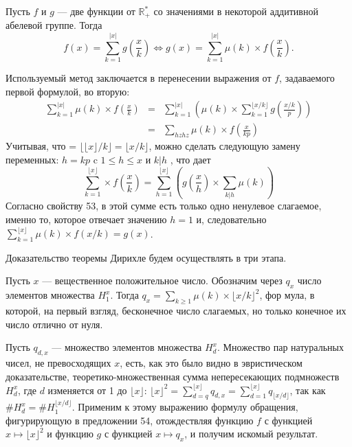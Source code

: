 \begin{predl}
Пусть $f$ и $g$ — две функции от $\mathbb{R}_{+}^{*}$ со значениями в некоторой ад­дитивной абелевой группе. Тогда
$$f(x)=\sum\limits_{k=1}^{|x|} g\left(\frac{x}{k}\right) \Longleftrightarrow g(x)=\sum\limits_{k=1}^{|x|}\mu(k)\times f\left(\frac{x}{k}\right).$$
\end{predl}
\begin{myproof}
Используемый метод заключается в перенесении выражения от $f$,
задаваемого первой формулой, во вторую:
$$\begin{array}{rcc}
\sum\limits_{k=1}^{|x|}\mu(k)\times f\left(\frac{x}{k}\right)&=&\sum\limits_{k=1}^{|x|}\left(\mu(k)\times\sum\limits_{k=1}^{\lfloor x/k \rfloor} g\left(\frac{x/k}{p}\right)\right)\\
&=&\sum\limits_{hzhz}\mu(k)\times f\left(\frac{x}{kp}\right)
\end{array}$$
Учитывая, что = $\lfloor\lfloor x \rfloor/k\rfloor = \lfloor x/k\rfloor$, можно сделать следующую замену
переменных: $h=kp$ c $1\leqslant h\leqslant x$ и $k|h$ , что дает
\newpage
$$\sum\limits_{k=1}^{\lfloor x \rfloor}\times f\left(\frac{x}{k}\right)=\sum_{h=1}^{\lfloor x\rfloor}\left( g\left(\frac{x}{h}\right)\times\sum\limits_{k|h}\mu(k)\right)$$
Согласно свойству 53, в этой сумме есть только одно ненулевое слагаемое, именно то, которое отвечает значению $h=1$ и, следовательно $\sum\nolimits_{k=1}^{\lfloor x\rfloor}\mu(k)\times f(x/k)=g(x)$.
\end{myproof}
Доказательство теоремы Дирихле будем осуществлять в три этапа.
\begin{lemma}
\hspace*{0.5cm}Пусть $x$ — вещественное положительное число. Обозначим через $q_{x}$
число элементов множества $H_{1}^x$. Тогда $q_{x}=\sum\nolimits_{k\geqslant 1}\mu(k)\times\lfloor x/k\rfloor^2$, фор­
мула, в которой, на первый взгляд, бесконечное число слагаемых, но
только конечное их число отлично от нуля.
\end{lemma}
\begin{myproof}
Пусть $q_{d,x}$ — множество элементов множества $H_{d}^x$. Множество пар
натуральных чисел, не превосходящих $x$, есть, как это было видно
в эвристическом доказательстве, теоретико-множественная сумма
непересекающих подмножеств $H_{d}^x$, где $d$ изменяется от 1 до $\lfloor x\rfloor$: $\lfloor x\rfloor^2=\sum\nolimits_{d=q}^{\lfloor x\rfloor}q_{d,x}=\sum\nolimits_{d=1}^{\lfloor x\rfloor}q_{\lfloor x/d\rfloor}$, так как $\#H_{d}^x=\#H_{1}^{\lfloor x/d\rfloor}$. Применим к этому выражению формулу обращения, фигурирующую в
предложении 54, отождествляя функцию $f$ с функцией $x\mapsto\lfloor x\rfloor^2$
 и функцию $g$ с функцией $x\mapsto q_{x}$, и получим искомый результат.
\end{myproof}

